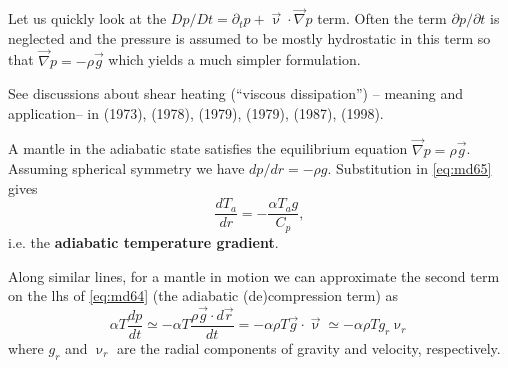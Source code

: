 Let us quickly look at the $Dp/Dt=\partial_t p + \vec\upnu\cdot\vec\nabla p$ term. 
Often the term $\partial p/\partial t$
is neglected and the pressure is assumed to be mostly hydrostatic in this term so 
that $\vec\nabla p = - \rho \vec{g}$ which yields a much simpler formulation. 

See discussions about shear heating (``viscous dissipation'') -- meaning and application-- in 
\textcite{froi73} (1973),
\textcite{stei78} (1978),
\textcite{biyu79} (1979),
\textcite{slsg79} (1979),
\textcite{wint87} (1987),
\textcite{madu98} (1998).

\vspace{1cm}

A mantle in the adiabatic state satisfies the equilibrium 
equation $\vec\nabla p = \rho \vec{g}$.
Assuming spherical symmetry we have $dp/dr=-\rho g$. Substitution 
in \eqref{eq:md65} gives
\begin{equation}
\frac{dT_a}{dr} = -\frac{\alpha T_a g}{C_p},
\label{eq:md66}
\end{equation}
i.e. the {\bf adiabatic temperature gradient}.

Along similar lines, for a mantle in motion we can approximate the second term on the
lhs of \eqref{eq:md64} (the adiabatic (de)compression term) as
\begin{equation}
\alpha T \frac{dp}{dt} \simeq 
- \alpha T \frac{\rho \vec{g}\cdot d\vec{r}}{dt} 
= -\alpha \rho T \vec{g} \cdot \vec{\upnu}
\simeq -\alpha \rho T g_r \upnu_r 
\label{eq:md67}
\end{equation}
where $g_r$ and $\upnu_r$ are the radial
components of gravity and velocity, respectively.


\vspace{0.5cm}



